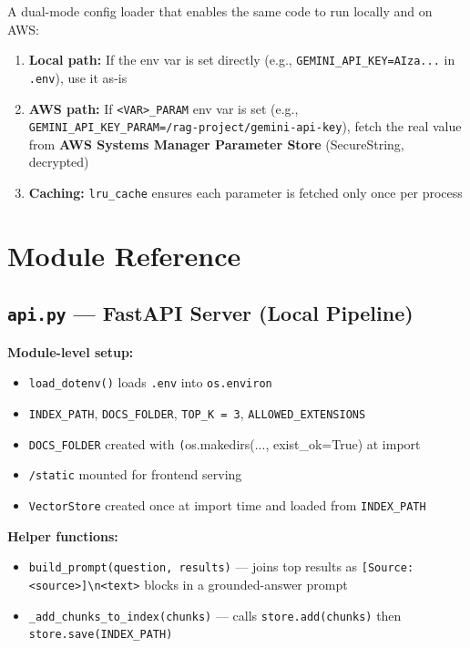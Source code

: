 \documentclass[11pt,a4paper]{paper}
\begin{document}
A dual-mode config loader that enables the same code to run locally and on AWS:

\begin{enumerate}
  \item \textbf{Local path:} If the env var is set directly (e.g., \texttt{GEMINI\_API\_KEY=AIza...} in \texttt{.env}), use it as-is
  \item \textbf{AWS path:} If \texttt{<VAR>\_PARAM} env var is set (e.g., \texttt{GEMINI\_API\_KEY\_PARAM=/rag-project/gemini-api-key}), fetch the real value from \textbf{AWS Systems Manager Parameter Store} (SecureString, decrypted)
  \item \textbf{Caching:} \texttt{lru\_cache} ensures each parameter is fetched only once per process
\end{enumerate}

\section{Module Reference}
\label{sec:modules}

\subsection{\texttt{api.py} — FastAPI Server (Local Pipeline)}

\textbf{Module-level setup:}
\begin{itemize}
  \item \texttt{load\_dotenv()} loads \texttt{.env} into \texttt{os.environ}
  \item \texttt{INDEX\_PATH}, \texttt{DOCS\_FOLDER}, \texttt{TOP\_K = 3}, \texttt{ALLOWED\_EXTENSIONS}
  \item \texttt{DOCS\_FOLDER} created with \texttt(os.makedirs(..., exist\_ok=True) at import
  \item \texttt{/static} mounted for frontend serving
  \item \texttt{VectorStore} created once at import time and loaded from \texttt{INDEX\_PATH}
\end{itemize}

\textbf{Helper functions:}
\begin{itemize}
  \item \texttt{build\_prompt(question, results)} — joins top results as \texttt{[Source: <source>]\textbackslash n<text>} blocks in a grounded-answer prompt
  \item \texttt{\_add\_chunks\_to\_index(chunks)} — calls \texttt{store.add(chunks)} then \texttt{store.save(INDEX\_PATH)}
\end{itemize}
\end{document}
